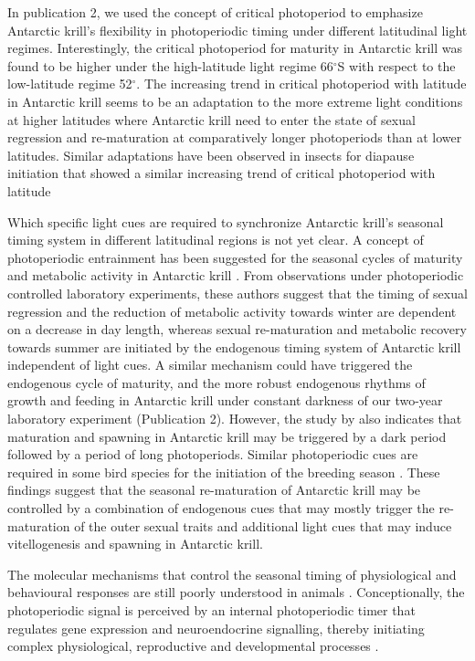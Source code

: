 In publication 2, we used the concept of critical photoperiod to emphasize
Antarctic krill's flexibility in photoperiodic timing under different
latitudinal light regimes. Interestingly, the critical photoperiod for maturity
in Antarctic krill was found to be higher under the high-latitude light regime
66$^{\circ}$S with respect to the low-latitude regime 52$^{\circ}$. The
increasing trend in critical photoperiod with latitude in Antarctic krill seems
to be an adaptation to the more extreme light conditions at higher latitudes
where Antarctic krill need to enter the state of sexual regression and
re-maturation at comparatively longer photoperiods than at lower latitudes.
Similar adaptations have been observed in insects for diapause initiation that
showed a similar increasing trend of critical photoperiod with latitude
\citep{brandt_biodiversity_2007, hut_latitudinal_2013,
tyukmaeva_adaptation_2011}

Which specific light cues are required to synchronize Antarctic krill's
seasonal timing system in different latitudinal regions is not yet clear. A
concept of photoperiodic entrainment has been suggested for the seasonal cycles
of maturity and metabolic activity in Antarctic krill
\citep{brown_flexible_2011, piccolin_seasonal_2018}. From observations under
photoperiodic controlled laboratory experiments, these authors suggest that the
timing of sexual regression and the reduction of metabolic activity towards
winter are dependent on a decrease in day length, whereas sexual re-maturation
and metabolic recovery towards summer are initiated by the endogenous timing
system of Antarctic krill independent of light cues. A similar mechanism could
have triggered the endogenous cycle of maturity, and the more robust endogenous
rhythms of growth and feeding in Antarctic krill under constant darkness of our
two-year laboratory experiment (Publication 2). However, the study by
\citet{hirano_antarctic_2003} also indicates that maturation and spawning in
Antarctic krill may be triggered by a dark period followed by a period of long
photoperiods.  Similar photoperiodic cues are required in some bird species for
the initiation of the breeding season \citep{helm_annual_2013}. These findings
suggest that the seasonal re-maturation of Antarctic krill may be controlled by
a combination of endogenous cues that may mostly trigger the re-maturation of
the outer sexual traits and additional light cues that may induce
vitellogenesis and spawning in Antarctic krill.

The molecular mechanisms that control the seasonal timing of physiological and
behavioural responses are still poorly understood in animals
\citep{helm_annual_2013}. Conceptionally, the photoperiodic signal is perceived
by an internal photoperiodic timer that regulates gene expression and
neuroendocrine signalling, thereby initiating complex physiological,
reproductive and developmental processes \citep{brandt_biodiversity_2007,
visser_phenology_2010}.

